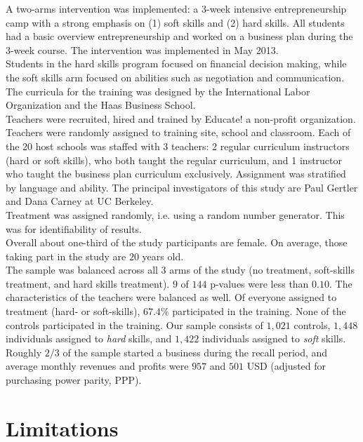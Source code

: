 \documentclass[oneside, notitlepage]{book}
\begin{document}
A two-arms intervention was implemented: a 3-week intensive entrepreneurship camp with a strong emphasis on (1) soft skills and (2) hard skills. All students had a basic overview entrepreneurship and worked on a business plan during the 3-week course. The intervention was implemented in May 2013. \\

Students in the hard skills program focused on financial decision making, while the soft skills arm focused on abilities such as negotiation and communication. The curricula for the training was designed by the International Labor Organization and the Haas Business School.\\

Teachers were recruited, hired and trained by Educate! a non-profit organization. Teachers were randomly assigned to training site, school and classroom. Each of the 20 host schools was staffed with 3 teachers: 2 regular curriculum instructors (hard or soft skills), who both taught the regular curriculum, and 1 instructor who taught the business plan curriculum exclusively. Assignment was stratified by language and ability. The principal investigators of this study are Paul Gertler and Dana Carney at UC Berkeley.\\

Treatment was assigned randomly, i.e. using a random number generator. This was for identifiability of results.\\

Overall about one-third of the study participants are female. On average, those taking part in the study are $20$ years old.\\

The sample was balanced across all 3 arms of the study (no treatment, soft-skills treatment, and hard skills treatment). $9$ of $144$ p-values were less than $0.10$. The characteristics of the teachers were balanced as well. Of everyone assigned to treatment (hard- or soft-skills), $67.4\%$ participated in the training. None of the controls participated in the training. Our sample consists of $1,021$ controls, $1,448$ individuals assigned to \textit{hard} skills, and $1,422$ individuals assigned to \textit{soft} skills. Roughly $2/3$ of the sample started a business during the recall period, and average monthly revenues and profits were $957$ and $501$ USD (adjusted for purchasing power parity, PPP).\\


\section{Limitations}
\label{sec:antic-chall}
\end{document}
